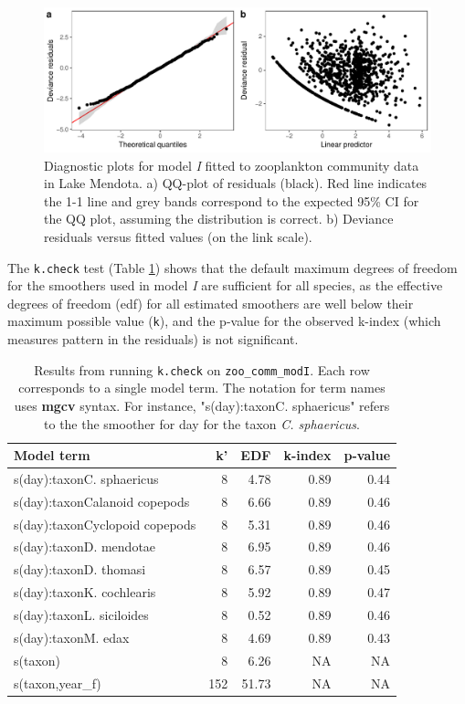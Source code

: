 \documentclass[12pt]{article}
\begin{document}
\begin{figure}
\centering
\includegraphics{../figures/zoo_comm_diag-1.pdf}
\caption{\label{fig:zoo_comm_diag_plot} Diagnostic plots for model
\emph{I} fitted to zooplankton community data in Lake Mendota. a)
QQ-plot of residuals (black). Red line indicates the 1-1 line and grey
bands correspond to the expected 95\% CI for the QQ plot, assuming the
distribution is correct. b) Deviance residuals versus fitted values (on
the link scale).}
\end{figure}

The \texttt{k.check} test (Table \ref{tab:zoo_comm_check_k_kable}) shows
that the default maximum degrees of freedom for the smoothers used in
model \emph{I} are sufficient for all species, as the effective degrees
of freedom (edf) for all estimated smoothers are well below their
maximum possible value (\texttt{k\textquotesingle{}}), and the p-value
for the observed k-index (which measures pattern in the residuals) is
not significant.

\begin{table}[t]

\caption{\label{tab:zoo_comm_check_k_kable}Results from running \texttt{k.check} on \texttt{zoo\_comm\_modI}. Each row corresponds to a single model term. The notation for term names uses \textbf{mgcv} syntax. For instance, "s(day):taxonC. sphaericus" refers to the the smoother for day for the taxon \textit{C. sphaericus}.}
\centering
\begin{tabular}{lrrrr}
\toprule
Model term & k' & EDF & k-index & p-value\\
\midrule
s(day):taxonC. sphaericus & 8 & 4.78 & 0.89 & 0.44\\
s(day):taxonCalanoid copepods & 8 & 6.66 & 0.89 & 0.46\\
s(day):taxonCyclopoid copepods & 8 & 5.31 & 0.89 & 0.46\\
s(day):taxonD. mendotae & 8 & 6.95 & 0.89 & 0.46\\
s(day):taxonD. thomasi & 8 & 6.57 & 0.89 & 0.45\\
\addlinespace
s(day):taxonK. cochlearis & 8 & 5.92 & 0.89 & 0.47\\
s(day):taxonL. siciloides & 8 & 0.52 & 0.89 & 0.46\\
s(day):taxonM. edax & 8 & 4.69 & 0.89 & 0.43\\
s(taxon) & 8 & 6.26 & NA & NA\\
s(taxon,year\_f) & 152 & 51.73 & NA & NA\\
\bottomrule
\end{tabular}
\end{table}
\end{document}
